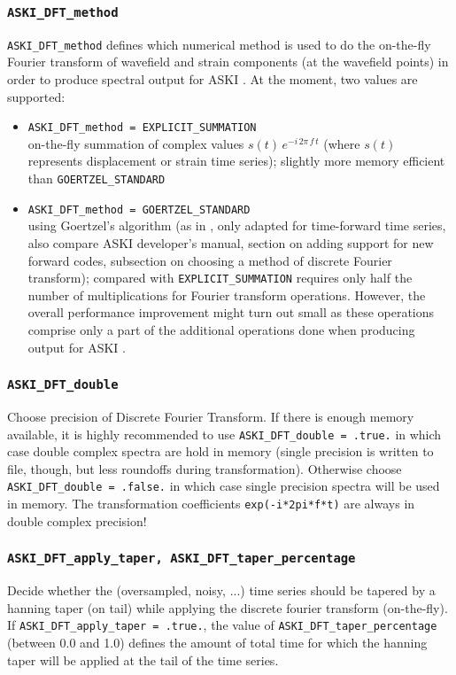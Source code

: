 \documentclass[12pt,a4paper]{article}
\newcommand{\lcode}[1]{\nolinkurl{#1}}
\newcommand{\ASKI}{ {\ttfamily ASKI} }
\begin{document}
\subsubsection*{\lcode{ASKI_DFT_method}}
\lcode{ASKI_DFT_method} defines which numerical method is used to do the on-the-fly Fourier transform of wavefield
and strain components (at the wavefield points) in order to produce spectral output for \ASKI{}. At the moment, 
two values are supported:
\begin{itemize}
\item \lcode{ASKI_DFT_method = EXPLICIT_SUMMATION} \\
  on-the-fly summation of complex values $s(t)\,e^{-i\,2\pi\,f\,t}$ (where $s(t)$ represents displacement or strain time series);
  slightly more memory efficient than \lcode{GOERTZEL_STANDARD}
\item \lcode{ASKI_DFT_method = GOERTZEL_STANDARD} \\
  using Goertzel's algorithm (as in \cite{Goertzel58}, only adapted for time-forward time series, also compare
  \ASKI{} developer's manual, section on adding support for new forward codes, subsection on choosing a method
  of discrete Fourier transform); 
  compared with \lcode{EXPLICIT_SUMMATION} requires only half the number of multiplications for Fourier 
  transform operations. However, the overall performance improvement might turn out small as these 
  operations comprise only a part of the additional operations done when producing output for \ASKI{}.
\end{itemize}
\subsubsection*{\lcode{ASKI_DFT_double}}
Choose precision of Discrete Fourier Transform. If there is enough memory available, it is highly recommended
to use \lcode{ASKI_DFT_double = .true.} in which case double complex spectra are hold in memory (single precision is 
written to file, though, but less roundoffs during transformation). Otherwise choose \lcode{ASKI_DFT_double = .false.}
in which case single precision spectra will be used in memory. The transformation coefficients \lcode{exp(-i*2pi*f*t)} 
are always in double complex precision!
\subsubsection*{\lcode{ASKI_DFT_apply_taper, ASKI_DFT_taper_percentage}}
Decide whether the (oversampled, noisy, ...) time series should be tapered by a hanning taper (on tail)
while applying the discrete fourier transform (on-the-fly). If \lcode{ASKI_DFT_apply_taper = .true.},
the value of \lcode{ASKI_DFT_taper_percentage} (between 0.0 and 1.0) defines the amount of
total time for which the hanning taper will be applied at the tail of the time series.
\end{document}
